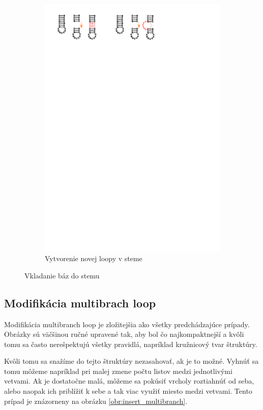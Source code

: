 \begin{figure}
\begin{subfigure}{\wi}
    \includegraphics[clip, trim=8cm 25cm 7cm 1cm, width=1\textwidth]{../img/alg/insert/stem}
    \caption{Vytvorenie novej loopy v steme}
  \end{subfigure}
  \caption{Vkladanie báz do stemu}
  \label{obr:insert_stem}
\end{figure}




\subsection{Modifikácia multibrach loop}

Modifikácia multibranch loop je zložitejšia ako všetky predchádzajúce prípady.
Obrázky sú väčšinou ručné upravené tak, aby bol čo najkompaktnejší a kvôli tomu
sa často nerešpektujú všetky pravidlá, napríklad kružnicový tvar štruktúry.

Kvôli tomu sa snažíme do tejto štruktúry nezasahovať, ak je to možné.
Vyhnúť sa tomu môžeme napríklad pri malej zmene počtu listov medzi jednotlivými vetvami.
Ak je dostatočne malá, môžeme sa pokúsiť vrcholy roztiahnúť od seba, alebo naopak ich
priblížiť k sebe a tak viac využiť miesto medzi vetvami. Tento prípad je znázorneny
na obrázku \ref{obr:insert_multibranch}.


